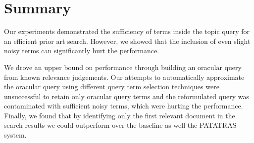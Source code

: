 \section{Summary}
\label{sec:Summary4}
Our experiments demonstrated the sufficiency of terms inside the topic query for an efficient prior art search. 
However, we showed that the inclusion of even slight noisy terms can significantly hurt the performance. 

We drove an upper bound on performance through building an oracular query from known relevance judgements. 
Our attempts to automatically approximate the oracular query using different query term selection techniques 
were unsuccessful to retain only oracular query terms and the reformulated query was contaminated with sufficient 
noisy terms, which were hurting the performance. Finally, we found that by
identifying only the first 
relevant document in the search results we could outperform over the baseline as well the PATATRAS system.

